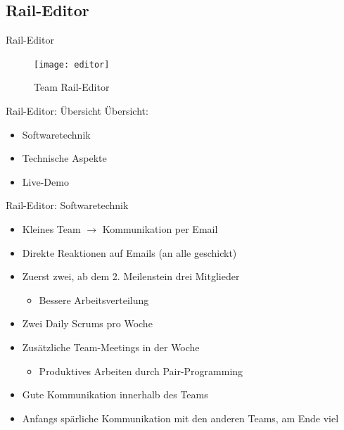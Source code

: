 \subsection{Rail-Editor}

\begin{frame}{Rail-Editor}

\begin{figure}
  \begin{center}
    \leavevmode
      \texttt{[image: editor]}
    \caption{Team Rail-Editor}
  \end{center}
\end{figure}

\end{frame}

\begin{frame}{Rail-Editor: Übersicht}
	\pause
	Übersicht:
	\begin{itemize}
		\pause
		\item Softwaretechnik
		\pause
		\item Technische Aspekte
		\pause
		\item Live-Demo
	\end{itemize}

\end{frame}

\pagebreak

\begin{frame}{Rail-Editor: Softwaretechnik}
	\pause
	\begin{itemize}
		\item Kleines Team $\rightarrow$ Kommunikation per Email
		\pause
		\item Direkte Reaktionen auf Emails (an alle geschickt)
		\pause
		\item Zuerst zwei, ab dem 2. Meilenstein drei Mitglieder
		\begin{itemize}
			\item Bessere Arbeitsverteilung
		\end{itemize}
		\pause
		\item Zwei Daily Scrums pro Woche
		\pause
		\item Zusätzliche Team-Meetings in der Woche
		\begin{itemize}
			\item Produktives Arbeiten durch Pair-Programming
		\end{itemize}
		\pause
		\item Gute Kommunikation innerhalb des Teams
		\pause
		\item Anfangs spärliche Kommunikation mit den anderen Teams, am Ende viel
	\end{itemize}
\end{frame}

